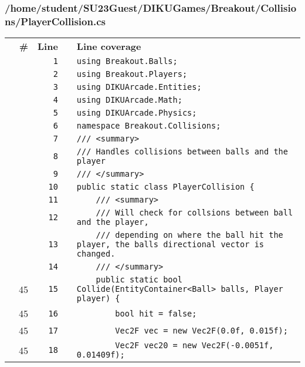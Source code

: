 \documentclass[a4paper,landscape,10pt]{article}
\begin{document}
\subsubsection{/home/student/SU23Guest/DIKUGames/Breakout/Collisions/PlayerCollision.cs}
\begin{longtable}[l]{lrrll}
\textbf{} & \textbf{\#} & \textbf{Line} & \textbf{} & \textbf{Line coverage}\\
\cellcolor{gray} &  & \verb~1~ & & \verb~using Breakout.Balls;~\\
\cellcolor{gray} &  & \verb~2~ & & \verb~using Breakout.Players;~\\
\cellcolor{gray} &  & \verb~3~ & & \verb~using DIKUArcade.Entities;~\\
\cellcolor{gray} &  & \verb~4~ & & \verb~using DIKUArcade.Math;~\\
\cellcolor{gray} &  & \verb~5~ & & \verb~using DIKUArcade.Physics;~\\
\cellcolor{gray} &  & \verb~6~ & & \verb~namespace Breakout.Collisions;~\\
\cellcolor{gray} &  & \verb~7~ & & \verb~/// <summary>~\\
\cellcolor{gray} &  & \verb~8~ & & \verb~/// Handles collisions between balls and the player~\\
\cellcolor{gray} &  & \verb~9~ & & \verb~/// </summary>~\\
\cellcolor{gray} &  & \verb~10~ & & \verb~public static class PlayerCollision {~\\
\cellcolor{gray} &  & \verb~11~ & & \verb~    /// <summary>~\\
\cellcolor{gray} &  & \verb~12~ & & \verb~    /// Will check for collsions between ball and the player,~\\
\cellcolor{gray} &  & \verb~13~ & & \verb~    /// depending on where the ball hit the player, the balls directional vector is changed.~\\
\cellcolor{gray} &  & \verb~14~ & & \verb~    /// </summary>~\\
\cellcolor{green} & 45 & \verb~15~ & & \verb~    public static bool Collide(EntityContainer<Ball> balls, Player player) {~\\
\cellcolor{green} & 45 & \verb~16~ & & \verb~        bool hit = false;~\\
\cellcolor{green} & 45 & \verb~17~ & & \verb~        Vec2F vec = new Vec2F(0.0f, 0.015f);~\\
\cellcolor{green} & 45 & \verb~18~ & & \verb~        Vec2F vec20 = new Vec2F(-0.0051f, 0.01409f);~\\

\end{longtable}
\end{document}
